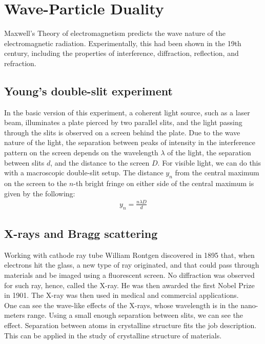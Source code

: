 \documentclass[11pt]{article}
\theoremstyle{break}
\theoremstyle{break}
\begin{document}
\section{Wave-Particle Duality}
Maxwell's Theory of electromagnetism predicts the wave nature of the electromagnetic radiation. Experimentally, this had been shown in the 19th century, including the properties of interference, diffraction, reflection, and refraction. 

\subsection{Young's double-slit experiment}
In the basic version of this experiment, a coherent light source, such as a laser beam, illuminates a plate pierced by two parallel slits, and the light passing through the slits is observed on a screen behind the plate. Due to the wave nature of the light, the separation between peaks of intensity in the interference pattern on the screen depends on the wavelength $\lambda $ of the light, the separation between slits $d$, and the distance to the screen $D$. For visible light, we can do this with a macroscopic double-slit setup. The distance $y_n$ from the central maximum on the screen to the $n$-th bright fringe on either side of the central maximum is given by the following:
\begin{align*}
y_n = \frac{n\lambda D}{d}
\end{align*}

\subsection{X-rays and Bragg scattering}
Working with cathode ray tube William Rontgen discovered in 1895 that, when electrons hit the glass, a new type of ray originated, and that could pass through materials and be imaged using a fluorescent screen. No diffraction was observed for such ray, hence, called the X-ray. He was then awarded the first Nobel Prize in 1901. The X-ray was then  used in medical and commercial applications.\\

One can see the wave-like effects of the X-rays, whose wavelength is in the nano-meters range. Using a small enough separation between slits, we can see the effect. Separation between atoms in crystalline structure fits the job description. This can be applied in  the study of crystalline structure of materials.\\
\end{document}
